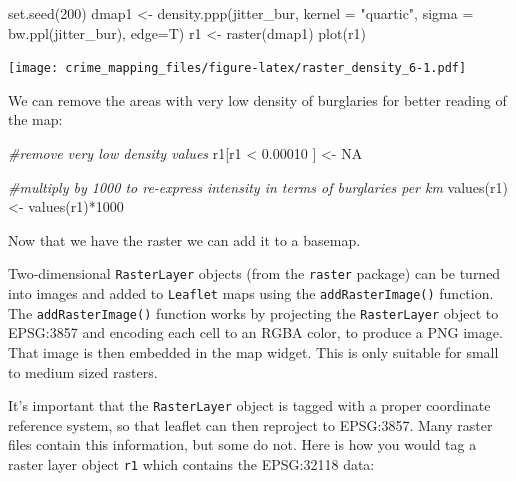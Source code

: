 \documentclass[
  krantz2]{krantz}
\makeatletter
\newenvironment{Shaded}{\begin{snugshade}}{\end{snugshade}}
\newcommand{\AttributeTok}[1]{\textcolor[rgb]{0.61,0.61,0.61}{#1}}
\newcommand{\CommentTok}[1]{\textcolor[rgb]{0.37,0.37,0.37}{\textit{#1}}}
\newcommand{\ConstantTok}[1]{\textcolor[rgb]{0,0,0}{#1}}
\newcommand{\DecValTok}[1]{\textcolor[rgb]{0.06,0.06,0.06}{#1}}
\newcommand{\FloatTok}[1]{\textcolor[rgb]{0.06,0.06,0.06}{#1}}
\newcommand{\FunctionTok}[1]{\textcolor[rgb]{0,0,0}{#1}}
\newcommand{\NormalTok}[1]{#1}
\newcommand{\OtherTok}[1]{\textcolor[rgb]{0.37,0.37,0.37}{#1}}
\newcommand{\SpecialCharTok}[1]{\textcolor[rgb]{0,0,0}{#1}}
\newcommand{\StringTok}[1]{\textcolor[rgb]{0.5,0.5,0.5}{#1}}
\newenvironment{kframe}{%
\medskip{}
\setlength{\fboxsep}{.8em}
 \def\at@end@of@kframe{}%
 \ifinner\ifhmode%
  \def\at@end@of@kframe{\end{minipage}}%
  \begin{minipage}{\columnwidth}%
 \fi\fi%
 \def\FrameCommand##1{\hskip\@totalleftmargin \hskip-\fboxsep
 \colorbox{shadecolor}{##1}\hskip-\fboxsep
     \hskip-\linewidth \hskip-\@totalleftmargin \hskip\columnwidth}%
 \MakeFramed {\advance\hsize-\width
   \@totalleftmargin\z@ \linewidth\hsize
   \@setminipage}}%
 {\par\unskip\endMakeFramed%
 \at@end@of@kframe}
\renewenvironment{Shaded}{\begin{kframe}}{\end{kframe}}
\makeatother
\begin{document}
\begin{Shaded}
\begin{Highlighting}[]
\FunctionTok{set.seed}\NormalTok{(}\DecValTok{200}\NormalTok{)}
\NormalTok{dmap1 }\OtherTok{\textless{}{-}} \FunctionTok{density.ppp}\NormalTok{(jitter\_bur, }\AttributeTok{kernel =} \StringTok{"quartic"}\NormalTok{,}
                     \AttributeTok{sigma =} \FunctionTok{bw.ppl}\NormalTok{(jitter\_bur), }
                     \AttributeTok{edge=}\NormalTok{T)}
\NormalTok{r1 }\OtherTok{\textless{}{-}} \FunctionTok{raster}\NormalTok{(dmap1)}
\FunctionTok{plot}\NormalTok{(r1)}
\end{Highlighting}
\end{Shaded}

\texttt{[image: crime\_mapping\_files/figure-latex/raster\_density\_6-1.pdf]}

We can remove the areas with very low density of burglaries for better reading of the map:

\begin{Shaded}
\begin{Highlighting}[]
\CommentTok{\#remove very low density values}
\NormalTok{r1[r1 }\SpecialCharTok{\textless{}} \FloatTok{0.00010}\NormalTok{ ] }\OtherTok{\textless{}{-}} \ConstantTok{NA}

\CommentTok{\#multiply by 1000 to re{-}express intensity in terms of burglaries per km}
\FunctionTok{values}\NormalTok{(r1) }\OtherTok{\textless{}{-}} \FunctionTok{values}\NormalTok{(r1)}\SpecialCharTok{*}\DecValTok{1000}
\end{Highlighting}
\end{Shaded}

Now that we have the raster we can add it to a basemap.

Two-dimensional \texttt{RasterLayer} objects (from the \texttt{raster} package) can be turned into images and added to \texttt{Leaflet} maps using the \texttt{addRasterImage()} function. The \texttt{addRasterImage()} function works by projecting the \texttt{RasterLayer} object to EPSG:3857 and encoding each cell to an RGBA color, to produce a PNG image. That image is then embedded in the map widget. This is only suitable for small to medium sized rasters.

It's important that the \texttt{RasterLayer} object is tagged with a proper coordinate reference system, so that leaflet can then reproject to EPSG:3857. Many raster files contain this information, but some do not. Here is how you would tag a raster layer object \texttt{r1} which contains the EPSG:32118 data:
\end{document}
